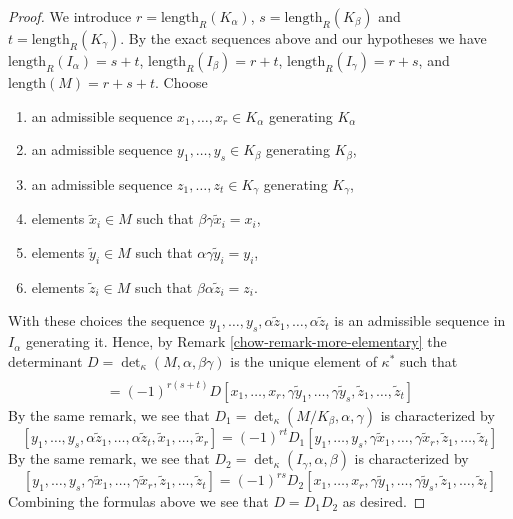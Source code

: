 \begin{proof}
\medskip\noindent
We introduce $r = \text{length}_R(K_\alpha)$,
$s = \text{length}_R(K_\beta)$ and $t = \text{length}_R(K_\gamma)$.
By the exact sequences above and our hypotheses we have
$\text{length}_R(I_\alpha) = s + t$, $\text{length}_R(I_\beta) = r + t$,
$\text{length}_R(I_\gamma) = r + s$, and
$\text{length}(M) = r + s + t$.
Choose
\begin{enumerate}
\item an admissible sequence $x_1, \ldots, x_r \in K_\alpha$
generating $K_\alpha$
\item an admissible sequence $y_1, \ldots, y_s \in K_\beta$
generating $K_\beta$,
\item an admissible sequence $z_1, \ldots, z_t \in K_\gamma$
generating $K_\gamma$,
\item elements $\tilde x_i \in M$ such that $\beta\gamma\tilde x_i = x_i$,
\item elements $\tilde y_i \in M$ such that $\alpha\gamma\tilde y_i = y_i$,
\item elements $\tilde z_i \in M$ such that $\beta\alpha\tilde z_i = z_i$.
\end{enumerate}
With these choices the sequence
$y_1, \ldots, y_s, \alpha\tilde z_1, \ldots, \alpha\tilde z_t$
is an admissible sequence in $I_\alpha$ generating it.
Hence, by Remark \ref{chow-remark-more-elementary} the determinant
$D = \det_\kappa(M, \alpha, \beta\gamma)$ is the
unique element of $\kappa^*$ such that
\begin{align*}
[y_1, \ldots, y_s,
\alpha\tilde z_1, \ldots, \alpha\tilde z_s,
\tilde x_1, \ldots, \tilde x_r] \\
= (-1)^{r(s + t)} D
[x_1, \ldots, x_r,
\gamma\tilde y_1, \ldots, \gamma\tilde y_s,
\tilde z_1, \ldots, \tilde z_t]
\end{align*}
By the same remark, we see that
$D_1 = \det_\kappa(M/K_\beta, \alpha, \gamma)$
is characterized by
$$
[y_1, \ldots, y_s,
\alpha\tilde z_1, \ldots, \alpha\tilde z_t,
\tilde x_1, \ldots, \tilde x_r]
=
(-1)^{rt} D_1
[y_1, \ldots, y_s,
\gamma\tilde x_1, \ldots, \gamma\tilde x_r,
\tilde z_1, \ldots, \tilde z_t]
$$
By the same remark, we see that
$D_2 = \det_\kappa(I_\gamma, \alpha, \beta)$ is characterized by
$$
[y_1, \ldots, y_s,
\gamma\tilde x_1, \ldots, \gamma\tilde x_r,
\tilde z_1, \ldots, \tilde z_t]
=
(-1)^{rs} D_2
[x_1, \ldots, x_r,
\gamma\tilde y_1, \ldots, \gamma\tilde y_s,
\tilde z_1, \ldots, \tilde z_t]
$$
Combining the formulas above we see that $D = D_1 D_2$
as desired.
\end{proof}


